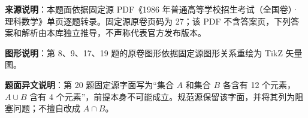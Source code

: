 


\begin{gktip}
\textbf{来源说明}：本题面依据固定源 PDF《1986 年普通高等学校招生考试（全国卷）·理科数学》单页逐题转录。固定源原卷页码为 27；该 PDF 不含答案页，下列答案和解析由本库独立推导，不声称代表官方发布版本。

\textbf{图形说明}：第 8、9、17、19 题的原卷图形依据固定源图形关系重绘为 TikZ 矢量图。

\textbf{题面异文说明}：第 20 题固定源字面写为“集合 $A$ 和集合 $B$ 各含有 12 个元素，$A\cup B$ 含有 4 个元素”，前提本身不可能成立。规范源保留该字面，并将其列为阻塞问题；不擅自改成 $A\cap B$。
\end{gktip}

